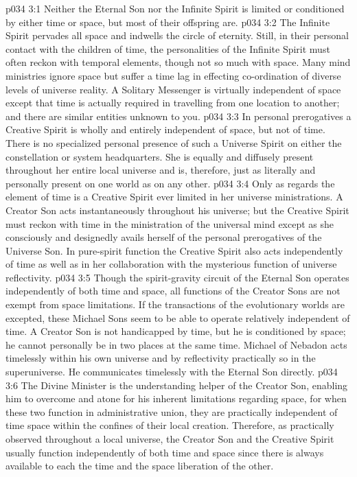 \vs p034 3:1 Neither the Eternal Son nor the Infinite Spirit is limited or conditioned by either time or space, but most of their offspring are.
\vs p034 3:2 The Infinite Spirit pervades all space and indwells the circle of eternity. Still, in their personal contact with the children of time, the personalities of the Infinite Spirit must often reckon with temporal elements, though not so much with space. Many mind ministries ignore space but suffer a time lag in effecting co\hyp{}ordination of diverse levels of universe reality. A Solitary Messenger is virtually independent of space except that time is actually required in travelling from one location to another; and there are similar entities unknown to you.
\vs p034 3:3 \pc In personal prerogatives a Creative Spirit is wholly and entirely independent of space, but not of time. There is no specialized personal presence of such a Universe Spirit on either the constellation or system headquarters. She is equally and diffusely present throughout her entire local universe and is, therefore, just as literally and personally present on one world as on any other.
\vs p034 3:4 Only as regards the element of time is a Creative Spirit ever limited in her universe ministrations. A Creator Son acts instantaneously throughout his universe; but the Creative Spirit must reckon with time in the ministration of the universal mind except as she consciously and designedly avails herself of the personal prerogatives of the Universe Son. In pure\hyp{}spirit function the Creative Spirit also acts independently of time as well as in her collaboration with the mysterious function of universe reflectivity.
\vs p034 3:5 \pc Though the spirit\hyp{}gravity circuit of the Eternal Son operates independently of both time and space, all functions of the Creator Sons are not exempt from space limitations. If the transactions of the evolutionary worlds are excepted, these Michael Sons seem to be able to operate relatively independent of time. A Creator Son is not handicapped by time, but he is conditioned by space; he cannot personally be in two places at the same time. Michael of Nebadon acts timelessly within his own universe and by reflectivity practically so in the superuniverse. He communicates timelessly with the Eternal Son directly.
\vs p034 3:6 The Divine Minister is the understanding helper of the Creator Son, enabling him to overcome and atone for his inherent limitations regarding space, for when these two function in administrative union, they are practically independent of time  space within the confines of their local creation. Therefore, as practically observed throughout a local universe, the Creator Son and the Creative Spirit usually function independently of both time and space since there is always available to each the time and the space liberation of the other.
